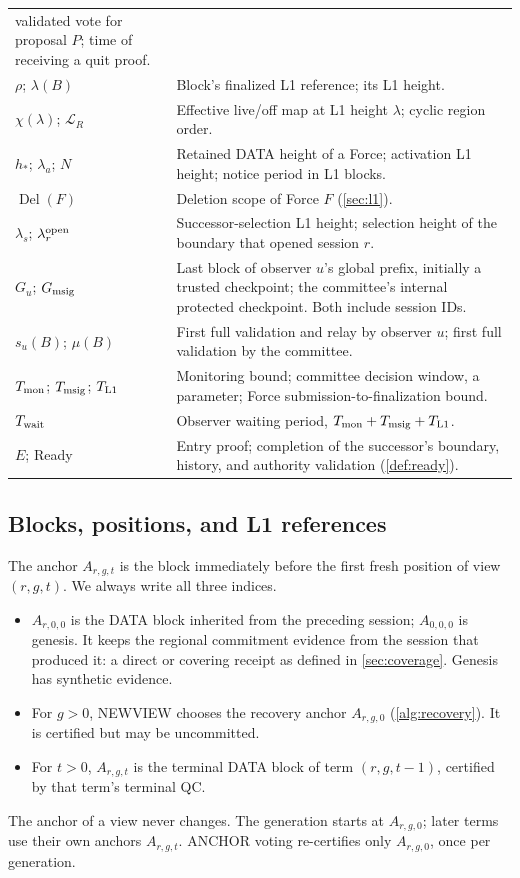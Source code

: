\documentclass[11pt,a4paper]{article}
\newif\ifrevmarks
\newcommand{\Rv}[1]{\ifrevmarks\leavevmode{\color{rvBlue}#1}\else#1\fi}
\newcommand{\Cid}[1]{\ifrevmarks\textsuperscript{\hyperlink{chg:#1}{\color{rvBlue}\sffamily\scriptsize#1}}\fi}
\newcommand{\Del}{\operatorname{Del}}
\newcommand{\Twait}{T_{\rm wait}}
\begin{document}
\begin{table}[htbp]
\begin{tabularx}{\linewidth}{@{}p{.29\linewidth}Y@{}}
validated vote for proposal $P$; time of receiving a quit proof.\\
$\rho$; $\lambda(B)$ & Block's finalized L1 reference; its L1 height.\\
$\chi(\lambda)$; $\mathcal L_R$ & Effective live/off map at L1 height
$\lambda$; cyclic region order.\\
$h_*$; $\lambda_a$; \Rv{$N$} & \Rv{Retained DATA height of a
Force; activation L1 height; notice period in L1 blocks.}\\
\Rv{$\Del(F)$} & \Rv{Deletion scope of Force $F$ (\cref{sec:l1}).}\\
$\lambda_s$; $\lambda_r^{\rm open}$ & Successor-selection L1 height;
selection height of the boundary that opened session $r$.\\
$G_u$; $G_{\rm msig}$ & \Rv{Last block of observer $u$'s
global prefix, initially a trusted checkpoint}; the committee's internal
protected checkpoint. Both include \Rv{session IDs}.\\
$s_u(B)$; \Rv{$\mu(B)$} & First full validation and relay by observer $u$;
first full validation by the committee.\\
$T_{\rm mon}$; $T_{\rm msig}$; $T_{\rm L1}$ & Monitoring bound;
committee decision window\Rv{, a parameter}; Force submission-to-finalization bound.\\
\Rv{$\Twait$} & Observer waiting period,
$T_{\rm mon}+T_{\rm msig}+T_{\rm L1}$.\\
$E$; \Rv{Ready} & Entry proof; completion of the
successor's boundary, history, and authority validation \Rv{(\cref{def:ready})}.\\
\bottomrule
\end{tabularx}
\end{table}

\subsection{Blocks, positions, and L1 references}
\label{sec:blocks}
The anchor $A_{r,g,t}$ is the block immediately before the first fresh
position of view $(r,g,t)$. We always write all three indices.
\begin{itemize}
\item $A_{r,0,0}$ is the DATA block inherited from the preceding
session; $A_{0,0,0}$ is genesis. It keeps the regional commitment evidence from the session that
produced it: a direct or covering receipt as defined in
\cref{sec:coverage}. Genesis has synthetic evidence.
\item For $g>0$, NEWVIEW chooses the recovery anchor $A_{r,g,0}$
(\cref{alg:recovery}). It is certified but may be uncommitted.
\item For $t>0$, $A_{r,g,t}$ is the terminal DATA block of term
$(r,g,t-1)$, certified by that term's terminal QC.
\end{itemize}
The anchor of a view never changes. The generation starts at
$A_{r,g,0}$; later terms use their own anchors $A_{r,g,t}$. ANCHOR voting
re-certifies only $A_{r,g,0}$, once per generation.
\end{document}
